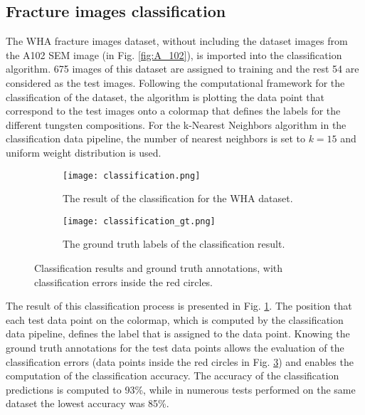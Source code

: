\documentclass[authoryear,preprint,review,12pt, singleside]{elsarticle}
\begin{document}
  
 
\subsection{Fracture images classification}

The WHA fracture images dataset, without including the dataset images from the A102 SEM image (in Fig. \ref{fig:A_102}), is imported into the classification algorithm. 675 images of this dataset are assigned to training and the rest 54 are considered as the test images. Following the computational framework for the classification of the dataset, the algorithm is plotting the data point that correspond to the test images onto a colormap that defines the labels for the different tungsten compositions. For the k-Nearest Neighbors algorithm in the classification data pipeline, the number of nearest neighbors is set to $k=15$ and uniform weight distribution is used.

\begin{figure}[!h]
	\centering
	\begin{subfigure}[b]{0.49\textwidth}
		\centering
		\texttt{[image: classification.png]}
		\caption{The result of the classification for the WHA dataset.}
		\label{fig:classification}
	\end{subfigure}
	\begin{subfigure}[b]{0.49\textwidth}
		\centering
		\texttt{[image: classification\_gt.png]}
		\caption{The ground truth labels of the classification result.}
		\label{fig:classification_gt}
	\end{subfigure}
	\caption{Classification results and ground truth annotations, with classification errors inside the red circles.}
\end{figure}

The result of this classification process is presented in Fig. \ref{fig:classification}. The position that each test data point on the colormap, which is computed by the classification data pipeline, defines the label that is assigned to the data point. Knowing the ground truth annotations for the test data points allows the evaluation of the classification errors (data points inside the red circles in Fig. \ref{fig:classification_gt}) and enables the computation of the classification accuracy. The accuracy of the classification predictions is computed to 93\%, while in numerous tests performed on the same dataset the lowest accuracy was 85\%.  
 
   
\end{document}
